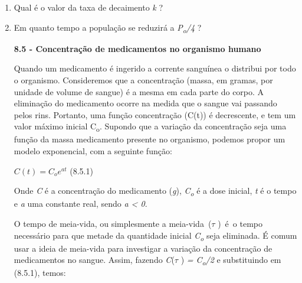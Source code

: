 \documentclass[12pt]{article}
\begin{document}
\begin{enumerate}
	\item Qual é o valor da taxa de decaimento \textit{k} ?\par

	\item Em quanto tempo a população se reduzirá a \textit{P\textsubscript{o}/4} ?\par


\vspace{\baselineskip}

\vspace{\baselineskip}

\vspace{\baselineskip}

\vspace{\baselineskip}
{\fontsize{14pt}{16.8pt}\selectfont \textbf{8.5 - Concentração de medicamentos no organismo humano}\par}\par


\vspace{\baselineskip}
\begin{justify}
Quando um medicamento é ingerido a corrente sanguínea o distribui por todo o organismo. Consideremos que a concentração (massa, em gramas, por unidade de volume de sangue) é a mesma em cada parte do corpo. A eliminação do medicamento ocorre na medida que o sangue vai passando pelos rins. Portanto, uma função concentração (C(t)) é decrescente, e tem um valor máximo inicial C\textsubscript{o}. Supondo que a variação da concentração seja uma função da massa medicamento presente no organismo, podemos propor um modelo exponencial, com a seguinte função:
\end{justify}\par

\begin{FlushRight}
 \( C \left( t \right) =C_{o}e^{at} \) \tab \tab \tab \tab \tab \tab (8.5.1)
\end{FlushRight}\par

\begin{justify}
Onde \textit{C} é a concentração do medicamento (\textit{g}), \textit{C\textsubscript{o}} é a dose inicial, \textit{t} é o tempo e \textit{a} uma constante real, sendo \textit{a < 0}.
\end{justify}\par

\begin{justify}
O tempo de meia-vida, ou simplesmente a meia-vida\  ($ \tau$ )\ é\ o tempo necessário para que metade da quantidade inicial   \textit{C\textsubscript{o}} seja eliminada. É comum usar a ideia de meia-vida para investigar a variação da concentração de medicamentos no sangue. Assim, fazendo \textit{C}($ \tau$ ) \textit{= C\textsubscript{o}/2} e substituindo em (8.5.1), temos:
\end{justify}\par


\end{enumerate}
\end{document}
